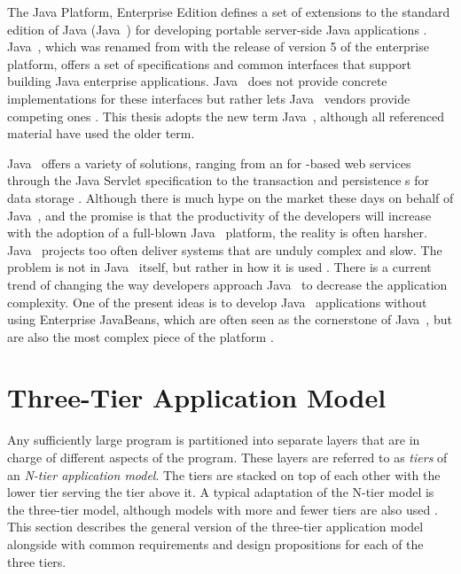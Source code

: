 The Java Platform, Enterprise Edition defines a set of extensions to 
the standard edition of Java (Java~) for developing 
portable server-side Java applications \citep{javaee}. 
Java~, which was renamed from  with the 
release of version 5 of the enterprise platform, offers a set of 
specifications and common interfaces that support building Java 
enterprise applications. Java~ does not provide concrete 
implementations for these interfaces but rather lets Java~ 
vendors provide competing ones \citep{usingj2ee}. This thesis adopts 
the new term Java~, although all referenced material have 
used the older term.

Java~ offers a variety of solutions, ranging from an 
 for -based web services through the Java 
Servlet specification to the transaction and persistence s 
for data storage \citep{javaee}. Although there is much hype on the 
market these days on behalf of Java~, and the promise is 
that the productivity of the developers will increase with the 
adoption of a full-blown Java~ platform, the reality is 
often harsher. Java~ projects too often deliver systems 
that are unduly complex and slow. The problem is not in 
Java~ itself, but rather in how it is used \citep{j2eednd}. 
There is a current trend of changing the way developers approach 
Java~ to decrease the application complexity. One of the 
present ideas is to develop Java~ applications without 
using Enterprise JavaBeans, which are often seen as the cornerstone of 
Java~, but are also the most complex piece of the platform 
\citep{rapidspring,j2eednd}.


\section{Three-Tier Application Model}
\label{toc:webdevel:threetier}

Any sufficiently large program is partitioned into separate layers 
that are in charge of different aspects of the program. These layers 
are referred to as \textsl{tiers} of an \textsl{N-tier application 
model}. The tiers are stacked on top of each other with the lower tier 
serving the tier above it. A typical adaptation of the N-tier model is 
the three-tier model, although models with more and fewer tiers are 
also used \citep{integratedarch}. This section describes the general 
version of the three-tier application model alongside with common 
requirements and design propositions for each of the three tiers.

